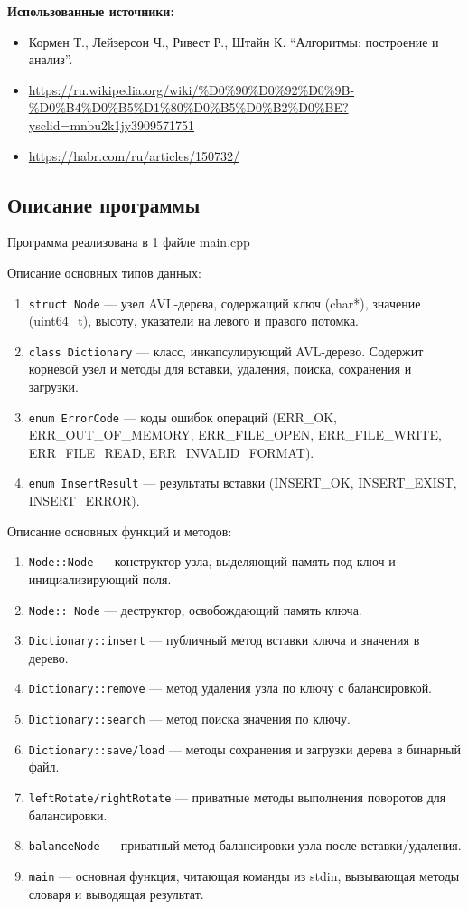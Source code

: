 \documentclass[12pt]{article}
\begin{document}
\vspace{0.3cm}


\textbf{Использованные источники:}
\begin{itemize}
\item Кормен Т., Лейзерсон Ч., Ривест Р., Штайн К. ``Алгоритмы: построение и анализ''.
\item \url{https://ru.wikipedia.org/wiki/%D0%90%D0%92%D0%9B-%D0%B4%D0%B5%D1%80%D0%B5%D0%B2%D0%BE?ysclid=mnbu2k1jy3909571751}
\item \url{https://habr.com/ru/articles/150732/}
\end{itemize} 

\subsection*{Описание программы}

Программа реализована в 1 файле main.cpp

Описание основных типов данных:
\begin{enumerate}
\item \texttt{struct Node} — узел AVL-дерева, содержащий ключ (char*), значение (uint64\_t), высоту, указатели на левого и правого потомка.
\item \texttt{class Dictionary} — класс, инкапсулирующий AVL-дерево. Содержит корневой узел и методы для вставки, удаления, поиска, сохранения и загрузки.
\item \texttt{enum ErrorCode} — коды ошибок операций (ERR\_OK, ERR\_OUT\_OF\_MEMORY, ERR\_FILE\_OPEN, ERR\_FILE\_WRITE, ERR\_FILE\_READ, ERR\_INVALID\_FORMAT).
\item \texttt{enum InsertResult} — результаты вставки (INSERT\_OK, INSERT\_EXIST, INSERT\_ERROR).
\end{enumerate}

Описание основных функций и методов:
\begin{enumerate}
\item \texttt{Node::Node} — конструктор узла, выделяющий память под ключ и инициализирующий поля.
\item \texttt{Node::~Node} — деструктор, освобождающий память ключа.
\item \texttt{Dictionary::insert} — публичный метод вставки ключа и значения в дерево.
\item \texttt{Dictionary::remove} — метод удаления узла по ключу с балансировкой.
\item \texttt{Dictionary::search} — метод поиска значения по ключу.
\item \texttt{Dictionary::save/load} — методы сохранения и загрузки дерева в бинарный файл.
\item \texttt{leftRotate/rightRotate} — приватные методы выполнения поворотов для балансировки.
\item \texttt{balanceNode} — приватный метод балансировки узла после вставки/удаления.
\item \texttt{main} — основная функция, читающая команды из stdin, вызывающая методы словаря и выводящая результат.
\end{enumerate}
\end{document}
